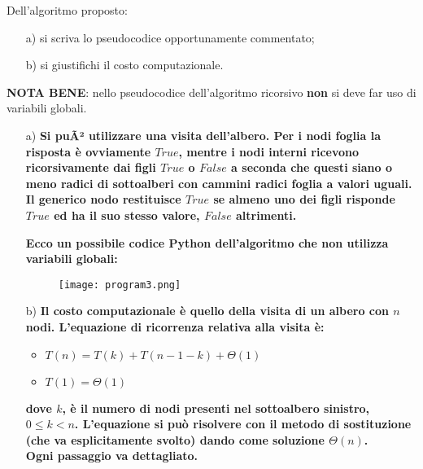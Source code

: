\documentclass[12pt]{article}
\begin{document}
\noindent 
Dell'algoritmo proposto:
\begin{itemize}
\item[a)] si scriva lo pseudocodice opportunamente commentato;
\item[b)] si giustifichi il costo computazionale.
\end{itemize}

\noindent 
{\bf NOTA BENE}: nello pseudocodice dell'algoritmo  ricorsivo {\bf non} si deve far uso di variabili globali.

\bigskip

\begin{itemize}
\item[a)]  
\textbf{Si puÃ² utilizzare una visita dell'albero. 
Per i nodi foglia la risposta \`e ovviamente $True$, mentre i nodi interni ricevono ricorsivamente dai  figli $True$ o $False$ a seconda che questi siano o meno radici di sottoalberi con cammini radici foglia a valori uguali. 
Il generico nodo restituisce $True$ se almeno uno dei figli risponde $True$ ed ha il suo stesso valore, $False$ altrimenti. }

\textbf{ Ecco un possibile codice Python dell'algoritmo che non utilizza variabili globali:}

\smallskip

\begin{figure}[h!]
\center
\texttt{[image: program3.png]}
\end{figure}

\item[b)]  
\textbf{Il costo computazionale \`e  quello della visita di un albero con $n$ nodi.  
L'equazione di ricorrenza relativa alla visita  \`e:}
\begin{itemize}
\item $T(n)=T(k)+T(n-1-k)+ \Theta(1)$
\item $T(1)= \Theta(1)$
\end{itemize}
\textbf{dove $k$,  \`e il numero di nodi presenti nel sottoalbero sinistro, $0\leq k<n$. 
L'equazione  si pu\`o risolvere con il metodo di sostituzione (che va esplicitamente svolto) dando come soluzione $\Theta(n)$. \\
Ogni passaggio va dettagliato.}
\end{itemize}
\end{document}
